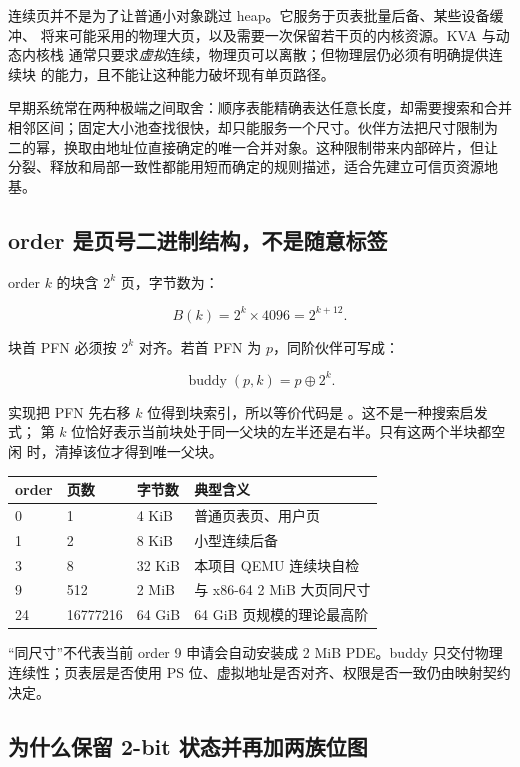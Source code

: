 连续页并不是为了让普通小对象跳过 heap。它服务于页表批量后备、某些设备缓冲、
将来可能采用的物理大页，以及需要一次保留若干页的内核资源。KVA 与动态内核栈
通常只要求\emph{虚拟}连续，物理页可以离散；但物理层仍必须有明确提供连续块
的能力，且不能让这种能力破坏现有单页路径。

早期系统常在两种极端之间取舍：顺序表能精确表达任意长度，却需要搜索和合并
相邻区间；固定大小池查找很快，却只能服务一个尺寸。伙伴方法把尺寸限制为
二的幂，换取由地址位直接确定的唯一合并对象。这种限制带来内部碎片，但让
分裂、释放和局部一致性都能用短而确定的规则描述，适合先建立可信页资源地基。

\subsection{order 是页号二进制结构，不是随意标签}

order \(k\) 的块含 \(2^k\) 页，字节数为：

\[
  B(k)=2^k\times4096=2^{k+12}.
\]

块首 PFN 必须按 \(2^k\) 对齐。若首 PFN 为 \(p\)，同阶伙伴可写成：

\[
  \operatorname{buddy}(p,k)=p\oplus2^k.
\]

实现把 PFN 先右移 \(k\) 位得到块索引，所以等价代码是
。这不是一种搜索启发式；
第 \(k\) 位恰好表示当前块处于同一父块的左半还是右半。只有这两个半块都空闲
时，清掉该位才得到唯一父块。

\begin{center}
\begin{tabular}{llll}
\toprule
order & 页数 & 字节数 & 典型含义\\
\midrule
0 & 1 & 4 KiB & 普通页表页、用户页\\
1 & 2 & 8 KiB & 小型连续后备\\
3 & 8 & 32 KiB & 本项目 QEMU 连续块自检\\
9 & 512 & 2 MiB & 与 x86-64 2 MiB 大页同尺寸\\
24 & 16777216 & 64 GiB & 64 GiB 页规模的理论最高阶\\
\bottomrule
\end{tabular}
\end{center}

“同尺寸”不代表当前 order 9 申请会自动安装成 2 MiB PDE。buddy 只交付物理
连续性；页表层是否使用 PS 位、虚拟地址是否对齐、权限是否一致仍由映射契约
决定。

\subsection{为什么保留 2-bit 状态并再加两族位图}

